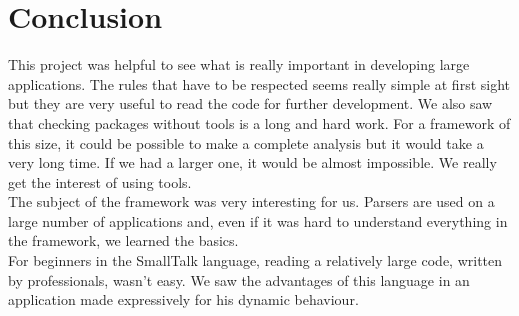 \section{Conclusion}
This project was helpful to see what is really important in developing large applications. The rules that have to be respected seems really simple at first sight but they are very useful to read the code for further development. We also saw that checking packages without tools is a long and hard work. For a framework of this size, it could be possible to make a complete analysis but it would take a very long time. If we had a larger one, it would be almost impossible. We really get the interest of using tools. \\
The subject of the framework was very interesting for us. Parsers are used on a large number of applications and, even if it was hard to understand everything in the framework, we learned the basics. \\
For beginners in the SmallTalk language, reading a relatively large code, written by professionals, wasn't easy. We saw the advantages of this language in an application made expressively for his dynamic behaviour. 



